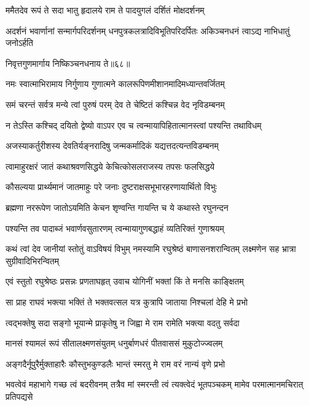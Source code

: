 \twolineshloka
{ममैतदेव रूपं ते सदा भातु हृदालये}
{राम ते पादयुगलं दर्शितं मोक्षदर्शनम्} %

\threelineshloka
{अदर्शनं भवार्णानां सन्मार्गपरिदर्शनम्}
{धनपुत्रकलत्रादिविभूतिपरिदर्पितः}
{अकिञ्चनधनं त्वाऽद्य नाभिधातुं जनोऽर्हति} %

\onelineshloka
{निवृत्तगुणमार्गाय निष्किञ्चनधनाय ते॥६८॥} %

\twolineshloka
{नमः स्वात्माभिरामाय निर्गुणाय गुणात्मने}
{कालरूपिणमीशानमादिमध्यान्तवर्जितम्} %

\twolineshloka
{समं चरन्तं सर्वत्र मन्ये त्वां पुरुषं परम्}
{देव ते चेष्टितं कश्चिन्न वेद नृविडम्बनम्} %

\twolineshloka
{न तेऽस्ति कश्चिद् दयितो द्वेष्यो वाऽपर एव च}
{त्वन्मायापिहितात्मानस्त्वां पश्यन्ति तथाविधम्} %

\twolineshloka
{अजस्याकर्तुरीशस्य देवतिर्यङ्नरादिषु}
{जन्मकर्मादिकं यद्यत्तदत्यन्तविडम्बनम्} %

\twolineshloka
{त्वामाहुरक्षरं जातं कथाश्रवणसिद्धये}
{केचित्कोसलराजस्य तपसः फलसिद्धये} %

\twolineshloka
{कौसल्यया प्रार्थ्यमानं जातमाहुः परे जनाः}
{दुष्टराक्षसभूभारहरणायार्थितो विभुः} %

\twolineshloka
{ब्रह्मणा नररूपेण जातोऽयमिति केचन}
{शृण्वन्ति गायन्ति च ये कथास्ते रघुनन्दन} %

\twolineshloka
{पश्यन्ति तव पादाब्जं भवार्णवसुतारणम्}
{त्वन्मायागुणबद्धाहं व्यतिरिक्तं गुणाश्रयम्} %

\threelineshloka
{कथं त्वां देव जानीयां स्तोतुं वाऽविषयं विभुम्}
{नमस्यामि रघुश्रेष्ठं बाणासनशरान्वितम्}
{लक्ष्मणेन सह भ्रात्रा सुग्रीवादिभिरन्वितम्} %

\twolineshloka
{एवं स्तुतो रघुश्रेष्ठः प्रसन्नः प्रणताघहृत्}
{उवाच योगिनीं भक्तां किं ते मनसि काङ्क्षितम्} %

\twolineshloka
{सा प्राह राघवं भक्त्या भक्तिं ते भक्तवत्सल}
{यत्र कुत्रापि जाताया निश्चलां देहि मे प्रभो} %

\twolineshloka
{त्वद्भक्तेषु सदा सङ्गो भूयान्मे प्राकृतेषु न}
{जिह्वा मे राम रामेति भक्त्या वदतु सर्वदा} %

\twolineshloka
{मानसं श्यामलं रूपं सीतालक्ष्मणसंयुतम्}
{धनुर्बाणधरं पीतवाससं मुकुटोज्ज्वलम्} %

\twolineshloka
{अङ्गदैर्नूपुरैर्मुक्ताहारैः कौस्तुभकुण्डलैः}
{भान्तं स्मरतु मे राम वरं नान्यं वृणे प्रभो} %


\threelineshloka
{भवत्वेवं महाभागे गच्छ त्वं बदरीवनम्}
{तत्रैव मां स्मरन्ती त्वं त्यक्त्वेदं भूतपञ्चकम्}
{मामेव परमात्मानमचिरात् प्रतिपद्यसे} %

